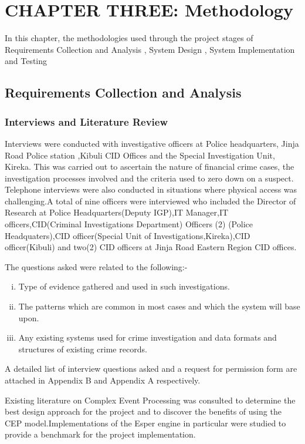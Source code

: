 
\section{CHAPTER THREE: Methodology}

\noindent In this chapter, the methodologies used through the project stages of Requirements Collection and Analysis , System Design , System Implementation and Testing 
\subsection{Requirements Collection and Analysis}
\subsubsection{Interviews and Literature Review}
\noindent Interviews were conducted with investigative officers at Police headquarters, Jinja Road Police station ,Kibuli CID Offices and the Special Investigation Unit, Kireka. This was carried out to ascertain the nature of financial crime cases, the investigation processes involved and the criteria used to zero down on a suspect. Telephone interviews were also conducted in situations where physical access was challenging.A total of nine officers were interviewed who included the Director of Research at Police Headquarters(Deputy IGP),IT Manager,IT officers,CID(Criminal Investigations Department) Officers (2) (Police Headquaters),CID officer(Special Unit of Investigations,Kireka),CID officer(Kibuli) and two(2) CID officers at Jinja Road Eastern Region CID offices. 

The questions asked were related to the following:-
\begin{enumerate}[(i)]
\item Type of evidence gathered and used in such investigations.
\item The patterns which are common in most cases and which the system will base upon.
\item Any existing systems used for crime investigation and data formats and structures of existing crime records.
 \end{enumerate}

\noindent A detailed list of  interview questions asked and a request for permission form are attached in  Appendix B and Appendix A respectively.

\noindent Existing literature on Complex Event Processing was consulted to determine the best design approach for the project and to discover the benefits of using the CEP model.Implementations of the Esper engine in particular were studied to provide a benchmark for the project implementation.

